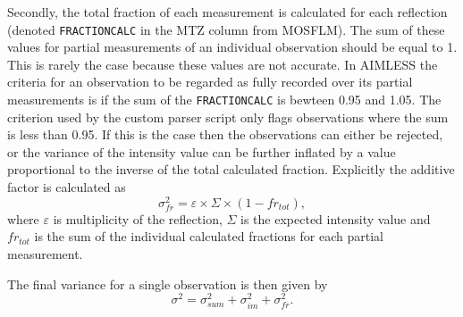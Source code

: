 Secondly, the total fraction of each measurement is calculated for each reflection (denoted \verb+FRACTIONCALC+ in the MTZ column from MOSFLM).
The sum of these values for partial measurements of an individual observation should be equal to 1.
This is rarely the case because these values are not accurate.
In AIMLESS the criteria for an observation to be regarded as fully recorded over its partial measurements is if the sum of the \verb+FRACTIONCALC+ is bewteen 0.95 and 1.05.
The criterion used by the custom parser script only flags observations where the sum is less than 0.95.
If this is the case then the observations can either be rejected, or the variance of the intensity value can be further inflated by a value proportional to the inverse of the total calculated fraction.
Explicitly the additive factor is calculated as
\begin{equation}
    \sigma^2_{fr} = \varepsilon \times \Sigma \times (1-fr_{tot}),
\end{equation}
where $\varepsilon$ is multiplicity of the reflection, $\Sigma$ is the expected intensity value and $fr_{tot}$ is the sum of the individual calculated fractions for each partial measurement.

The final variance for a single observation is then given by
\begin{equation}
    \sigma^2 = \sigma^2_{sum} + \sigma_{im}^2 + \sigma^2_{fr}.
\end{equation}
